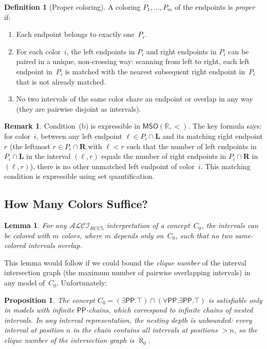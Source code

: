 \documentclass[a4paper,11pt]{article}
\newtheorem{lemma}[theorem]{Lemma}
\newtheorem{proposition}[theorem]{Proposition}
\theoremstyle{definition}
\newtheorem{definition}[theorem]{Definition}
\newtheorem{remark}[theorem]{Remark}
\newcommand{\ALCIRCC}[1]{\ensuremath{\mathcal{ALCI}_{\mathit{RCC#1}}}}
\newcommand{\PP}{\ensuremath{\mathsf{PP}}}
\newcommand{\MSO}{\ensuremath{\mathsf{MSO}}}
\newcommand{\reals}{\ensuremath{\mathbb{R}}}
\begin{document}
\begin{definition}[Proper coloring]
\label{def:coloring}
A coloring $P_1, \ldots, P_m$ of the endpoints is \emph{proper} if:
\begin{enumerate}[nosep,label=(\alph*)]
  \item Each endpoint belongs to exactly one~$P_i$.
  \item For each color~$i$, the left endpoints in $P_i$ and right
    endpoints in $P_i$ can be paired in a unique, non-crossing way:
    scanning from left to right, each left endpoint in~$P_i$ is
    matched with the nearest subsequent right endpoint in~$P_i$ that
    is not already matched.
  \item No two intervals of the same color share an endpoint or
    overlap in any way (they are pairwise disjoint as intervals).
\end{enumerate}
\end{definition}

\begin{remark}
Condition~(b) is expressible in $\MSO(\reals, <)$.  The key formula
says: for color~$i$, between any left endpoint $\ell \in P_i \cap
\mathbf{L}$ and its matching right endpoint $r$ (the leftmost
$r \in P_i \cap \mathbf{R}$ with $\ell < r$ such that the number of
left endpoints in $P_i \cap \mathbf{L}$ in the interval $(\ell, r)$
equals the number of right endpoints in $P_i \cap \mathbf{R}$ in
$(\ell, r)$), there is no other unmatched left endpoint of color~$i$.
This matching condition is expressible using set quantification.
\end{remark}

\subsection{How Many Colors Suffice?}
\label{sec:colors}

\begin{lemma}
\label{lem:colors}
For any $\ALCIRCC{5}$ interpretation of a concept~$C_0$, the
intervals can be colored with $m$ colors, where $m$ depends only
on~$C_0$, such that no two same-colored intervals overlap.
\end{lemma}

This lemma would follow if we could bound the \emph{clique number}
of the interval intersection graph (the maximum number of pairwise
overlapping intervals) in any model of~$C_0$.  Unfortunately:

\begin{proposition}
\label{prop:unbounded-clique}
The concept $C_0 = (\exists \PP.\top) \sqcap (\forall \PP.\exists \PP.\top)$
is satisfiable only in models with infinite $\PP$-chains, which correspond to
infinite chains of nested intervals. In any interval representation, the
nesting depth is unbounded: every interval at position $n$ in the chain
contains all intervals at positions $> n$, so the clique number of the
intersection graph is $\aleph_0$.
\end{proposition}
\end{document}

